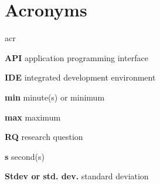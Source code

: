 \chapter*{Acronyms}

\begin{labeling}{acr}
    \item [\textbf{API}] application programming interface
    \item [\textbf{IDE}] integrated development environment
    \item [\textbf{min}] minute(s) or minimum
    \item [\textbf{max}] maximum
    \item [\textbf{RQ}] research question
    \item [\textbf{s}] second(s)
    \item [\textbf{Stdev or std. dev.}] standard deviation
\end{labeling}